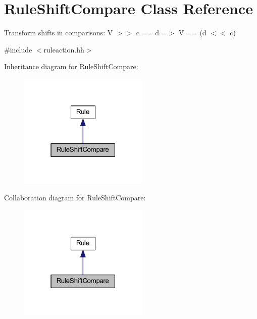 \hypertarget{class_rule_shift_compare}{}\section{Rule\+Shift\+Compare Class Reference}
\label{class_rule_shift_compare}


Transform shifts in comparisons\+: {\ttfamily V $>$$>$ c == d =$>$ V == (d $<$$<$ c)}  




{\ttfamily \#include $<$ruleaction.\+hh$>$}



Inheritance diagram for Rule\+Shift\+Compare\+:
\nopagebreak
\begin{figure}[H]
\begin{center}
\leavevmode
\includegraphics[width=175pt]{class_rule_shift_compare__inherit__graph}
\end{center}
\end{figure}


Collaboration diagram for Rule\+Shift\+Compare\+:
\nopagebreak
\begin{figure}[H]
\begin{center}
\leavevmode
\includegraphics[width=175pt]{class_rule_shift_compare__coll__graph}
\end{center}
\end{figure}
